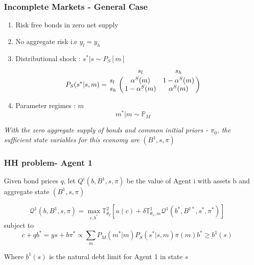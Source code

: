 \documentclass{beamer}
\theoremstyle{definition}
\begin{document}
\begin{frame}
\frametitle{Incomplete Markets - General Case}
\begin{enumerate}
	\item Risk free bonds in zero net supply
	\item No aggregate risk i.e $y_{l}=y_{h}$
	\item Distributional shock  : $s^*|s \sim P_S[m]$ 
	\[P_S(s^*|s,m)=\bordermatrix{~ & s_l & s_h \cr
														s_l & \alpha^S(m) & 1-\alpha^S(m) \cr
														s_h & 1-\alpha^S(m) & \alpha^S(m) \cr} \]
	\item Parameter regimes  : $m$
	\[m^* | m  \sim \mathbb{P}_{M}\]													
	\end{enumerate}
\emph{With the zero aggregate supply of bonds and common initial priors - $\pi_0$, the sufficient state variables for this economy are $(B^1, s, \pi)$ }

\end{frame}

\begin{frame}
\frametitle{HH problem- Agent 1 }
\noindent Given bond prices $q$, let $Q^i(b,B^1,s,\pi)$ be the value of Agent i with assets b and aggregate state $(B^1,s,\pi)$

\begin{equation}
\label{BEAgent1ValueFunction}
\mathcal{Q}^1(b,B^1,s,\pi)=\max_{c,b^*} { \mathbb{T}^2_{\theta_2} \left[u(c)+\delta \mathbb{T}^1_{\theta_1,m}\mathcal{Q}^1 (b^*,B^{1*},s^*,\pi^*)\right]}
\end{equation}
subject to
\begin{subequations}
\begin{equation}
c+qb^*=ys+b
\end{equation}
\begin{equation}
\pi^* \propto \sum_{m}{P_M(m^*|m)P_S(s^*|s,m)\pi(m)}
\end{equation}
\begin{equation}
b^* \geq \underbar{b}^1(s)
\end{equation}
\end{subequations}

Where $\underbar{b}^1(s)$ is the natural debt limit for Agent 1 in state $s$
\end{frame}
\end{document}
